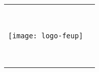 \begin{titlepage}
\null\vfill
\begin{center}
\large
\sffamily

\bigskip

{\Large\spacedlowsmallcaps{\myName}} \\

\bigskip

{\huge\spacedlowsmallcaps{\myTitle} \\
}

\bigskip

\vspace{5cm}

{} \\
{} \\

\bigskip
    
\vspace{4cm}

\begin{tabular} {cc}
\parbox{0.3\textwidth}{\texttt{[image: logo-feup]}}
&
\parbox{0.7\textwidth}{{\Large\spacedlowsmallcaps{\mySubTitle}} \\ 

					{\normalsize
					
					\myGroup \\
					\myUrl \\
					\myTime}}
			\end{tabular}
\end{center}
\vfill
\end{titlepage}



